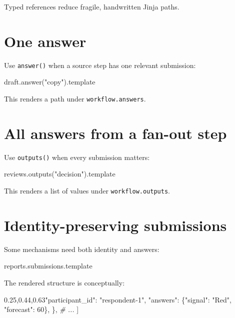 \documentclass[
  10pt,
]{report}
\newenvironment{Shaded}{}{}
\newcommand{\CommentTok}[1]{\textcolor[rgb]{0.38,0.63,0.69}{\textit{#1}}}
\newcommand{\DecValTok}[1]{\textcolor[rgb]{0.25,0.63,0.44}{#1}}
\newcommand{\NormalTok}[1]{#1}
\newcommand{\StringTok}[1]{\textcolor[rgb]{0.25,0.44,0.63}{#1}}
\begin{document}
Typed references reduce fragile, handwritten Jinja paths.

\section{One answer}\label{one-answer}

Use \texttt{answer()} when a source step has one relevant submission:

\begin{Shaded}
\begin{Highlighting}[]
\NormalTok{draft.answer(}\StringTok{"copy"}\NormalTok{).template}
\end{Highlighting}
\end{Shaded}

This renders a path under \texttt{workflow.answers}.

\section{All answers from a fan-out
step}\label{all-answers-from-a-fan-out-step}

Use \texttt{outputs()} when every submission matters:

\begin{Shaded}
\begin{Highlighting}[]
\NormalTok{reviews.outputs(}\StringTok{"decision"}\NormalTok{).template}
\end{Highlighting}
\end{Shaded}

This renders a list of values under \texttt{workflow.outputs}.

\section{Identity-preserving
submissions}\label{identity-preserving-submissions}

Some mechanisms need both identity and answers:

\begin{Shaded}
\begin{Highlighting}[]
\NormalTok{reports.submissions.template}
\end{Highlighting}
\end{Shaded}

The rendered structure is conceptually:

\begin{Shaded}
\begin{Highlighting}[]
\NormalTok{[}
\NormalTok{    \{}
        \StringTok{"participant\_id"}\NormalTok{: }\StringTok{"respondent{-}1"}\NormalTok{,}
        \StringTok{"answers"}\NormalTok{: \{}\StringTok{"signal"}\NormalTok{: }\StringTok{"Red"}\NormalTok{, }\StringTok{"forecast"}\NormalTok{: }\DecValTok{60}\NormalTok{\},}
\NormalTok{    \},}
    \CommentTok{\# ...}
\NormalTok{]}
\end{Highlighting}
\end{Shaded}
\end{document}
